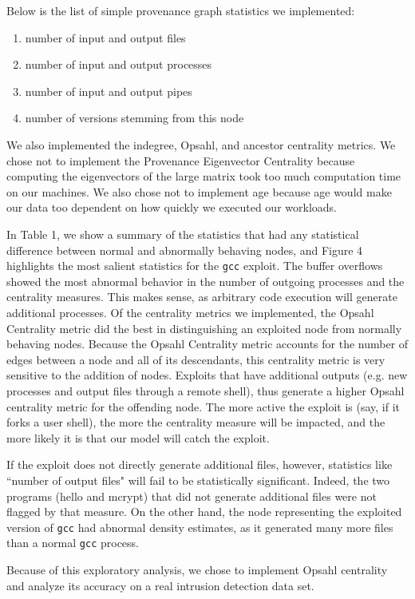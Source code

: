 \documentclass[10pt,twocolumn]{article}
\begin{document}
Below is the list of simple provenance graph statistics we implemented:
\begin{enumerate}
\item number of input and output files
\item number of input and output processes
\item number of input and output pipes
\item number of versions stemming from this node
\end{enumerate}
We also implemented the indegree, Opsahl, and ancestor centrality metrics.
We chose not to implement the Provenance Eigenvector Centrality because computing
the eigenvectors of the large matrix took too much computation time on our machines.
We also chose not to implement age because age would make our data too dependent
on how quickly we executed our workloads.

In Table 1, we show a summary of the statistics that had any statistical difference between normal and abnormally behaving nodes, and Figure 4 highlights the most salient statistics for the \texttt{gcc} exploit. The buffer overflows showed the most abnormal behavior in the number of outgoing processes and the centrality measures. This makes sense, as arbitrary code execution will generate additional processes. Of the centrality metrics we implemented, the Opsahl Centrality metric did the best in distinguishing an exploited node from normally behaving nodes. Because the Opsahl Centrality metric accounts for the number of edges between a node and all of its descendants, this centrality metric is very sensitive to the addition of nodes. Exploits that have additional outputs (e.g. new processes and output files through a remote shell), thus generate a higher Opsahl centrality metric for the offending node. The more active the exploit is (say, if it forks a user shell), the more the centrality measure will be impacted, and the more likely it is that our model will catch the exploit.

If the exploit does not directly generate additional files, however, statistics like ``number of output files" will fail to be statistically significant. Indeed, the two programs (hello and mcrypt) that did not generate additional files were not flagged by that measure. On the other hand, the node representing the exploited version of \texttt{gcc} had abnormal density estimates, as it generated many more files than a normal \texttt{gcc} process. 

Because of this exploratory analysis, we chose to implement Opsahl centrality and analyze its accuracy on a real intrusion detection data set.
\end{document}
